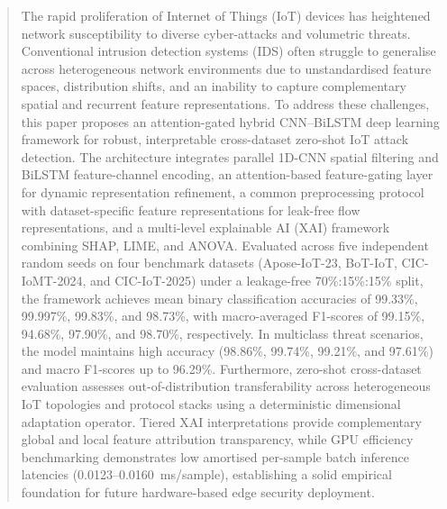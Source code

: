 \documentclass[a4paper,fleqn]{cas-sc}
\begin{document}









\begin{abstract}
{\color{blue}The rapid proliferation of Internet of Things (IoT) devices has heightened network susceptibility to diverse cyber-attacks and volumetric threats. Conventional intrusion detection systems (IDS) often struggle to generalise across heterogeneous network environments due to unstandardised feature spaces, distribution shifts, and an inability to capture complementary spatial and recurrent feature representations. To address these challenges, this paper proposes an attention-gated hybrid CNN--BiLSTM deep learning framework for robust, interpretable cross-dataset zero-shot IoT attack detection. The architecture integrates parallel 1D-CNN spatial filtering and BiLSTM feature-channel encoding, an attention-based feature-gating layer for dynamic representation refinement, a common preprocessing protocol with dataset-specific feature representations for leak-free flow representations, and a multi-level explainable AI (XAI) framework combining SHAP, LIME, and ANOVA. Evaluated across five independent random seeds on four benchmark datasets (Apose-IoT-23, BoT-IoT, CIC-IoMT-2024, and CIC-IoT-2025) under a leakage-free 70\%:15\%:15\% split, the framework achieves mean binary classification accuracies of 99.33\%, 99.997\%, 99.83\%, and 98.73\%, with macro-averaged F1-scores of 99.15\%, 94.68\%, 97.90\%, and 98.70\%, respectively. In multiclass threat scenarios, the model maintains high accuracy (98.86\%, 99.74\%, 99.21\%, and 97.61\%) and macro F1-scores up to 96.29\%. Furthermore, zero-shot cross-dataset evaluation assesses out-of-distribution transferability across heterogeneous IoT topologies and protocol stacks using a deterministic dimensional adaptation operator. Tiered XAI interpretations provide complementary global and local feature attribution transparency, while GPU efficiency benchmarking demonstrates low amortised per-sample batch inference latencies (0.0123--0.0160~ms/sample), establishing a solid empirical foundation for future hardware-based edge security deployment.}
\end{abstract}
\end{document}
